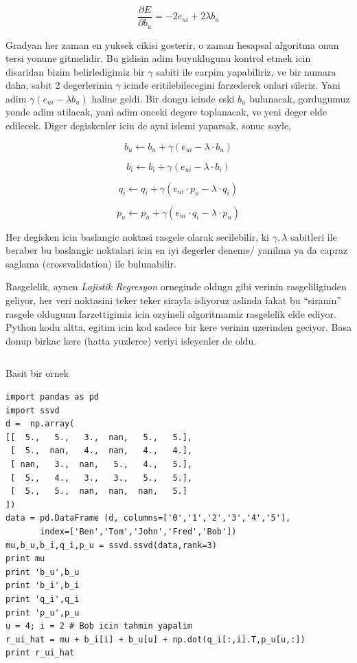 \documentclass[12pt,fleqn]{article}\usepackage{../common}
\begin{document}
$$ \frac{\partial E}{\partial b_u}  = -2e_{ui} + 2 \lambda b_u
$$

Gradyan her zaman en yuksek cikisi gosterir, o zaman hesapsal algoritma
onun tersi yonune gitmelidir. Bu gidisin adim buyuklugunu kontrol etmek
icin disaridan bizim belirledigimiz bir $\gamma$ sabiti ile carpim
yapabiliriz, ve bir numara daha, sabit 2 degerlerinin $\gamma$ icinde
eritilebilecegini farzederek onlari sileriz. Yani adim $\gamma(e_{ui} - \lambda b_u)$ 
haline geldi. Bir dongu icinde eski $b_u$ bulunacak,
gordugumuz yonde adim atilacak, yani adim onceki degere toplanacak, ve yeni
deger elde edilecek. Diger degiskenler icin de ayni islemi yaparsak, sonuc 
soyle,

$$
b_u \leftarrow b_u + \gamma (e_{ui} - \lambda \cdot b_u)
$$

$$
b_i \leftarrow b_i + \gamma (e_{ui} - \lambda \cdot b_i)
$$

$$
q_i \leftarrow q_i + \gamma (e_{ui}\cdot p_u - \lambda \cdot q_i)
$$

$$
p_u \leftarrow p_u + \gamma (e_{ui}\cdot q_i - \lambda \cdot p_u)
$$

Her degisken icin baslangic noktasi rasgele olarak secilebilir, ki
$\gamma,\lambda$ sabitleri ile beraber bu baslangic noktalari icin en iyi degerler
deneme/ yanilma ya da capraz saglama (crossvalidation) ile bulunabilir.

Rasgelelik, aynen {\em Lojistik Regresyon} orneginde oldugu gibi verinin
rasgeliliginden geliyor, her veri noktasini teker teker sirayla isliyoruz
aslinda fakat bu ``siranin'' rasgele oldugunu farzettigimiz icin ozyineli 
algoritmamiz rasgelelik elde ediyor. Python kodu altta, egitim icin kod
sadece bir kere verinin uzerinden geciyor. Basa donup birkac kere (hatta
yuzlerce) veriyi isleyenler de oldu.

\inputminted[fontsize=\footnotesize]{python}{ssvd.py}

Basit bir ornek

\begin{verbatim}
import pandas as pd
import ssvd
d =  np.array(
[[  5.,   5.,   3.,  nan,   5.,   5.],
 [  5.,  nan,   4.,  nan,   4.,   4.],
 [ nan,   3.,  nan,   5.,   4.,   5.],
 [  5.,   4.,   3.,   3.,   5.,   5.],
 [  5.,   5.,  nan,  nan,  nan,   5.]
])
data = pd.DataFrame (d, columns=['0','1','2','3','4','5'],
       index=['Ben','Tom','John','Fred','Bob'])
mu,b_u,b_i,q_i,p_u = ssvd.ssvd(data,rank=3)
print mu
print 'b_u',b_u
print 'b_i',b_i
print 'q_i',q_i
print 'p_u',p_u
u = 4; i = 2 # Bob icin tahmin yapalim
r_ui_hat = mu + b_i[i] + b_u[u] + np.dot(q_i[:,i].T,p_u[u,:])
print r_ui_hat
\end{verbatim}
\end{document}
